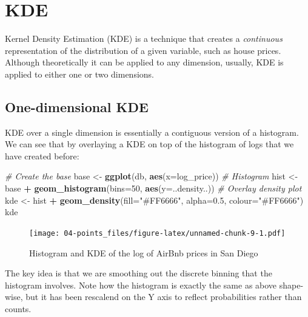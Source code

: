 \documentclass[
]{book}
\newenvironment{Shaded}{\begin{snugshade}}{\end{snugshade}}
\newcommand{\CommentTok}[1]{\textcolor[rgb]{0.56,0.35,0.01}{\textit{#1}}}
\newcommand{\DataTypeTok}[1]{\textcolor[rgb]{0.13,0.29,0.53}{#1}}
\newcommand{\DecValTok}[1]{\textcolor[rgb]{0.00,0.00,0.81}{#1}}
\newcommand{\FloatTok}[1]{\textcolor[rgb]{0.00,0.00,0.81}{#1}}
\newcommand{\KeywordTok}[1]{\textcolor[rgb]{0.13,0.29,0.53}{\textbf{#1}}}
\newcommand{\NormalTok}[1]{#1}
\newcommand{\OperatorTok}[1]{\textcolor[rgb]{0.81,0.36,0.00}{\textbf{#1}}}
\newcommand{\StringTok}[1]{\textcolor[rgb]{0.31,0.60,0.02}{#1}}
\begin{document}
\hypertarget{kde}{%
\section{KDE}\label{kde}}

Kernel Density Estimation (KDE) is a technique that creates a \emph{continuous} representation of the distribution of a given variable, such as house prices. Although theoretically it can be applied to any dimension, usually, KDE is applied to either one or two dimensions.

\hypertarget{one-dimensional-kde}{%
\subsection{One-dimensional KDE}\label{one-dimensional-kde}}

KDE over a single dimension is essentially a contiguous version of a histogram. We can see that by overlaying a KDE on top of the histogram of logs that we have created before:

\begin{Shaded}
\begin{Highlighting}[]
\CommentTok{# Create the base}
\NormalTok{base <-}\StringTok{ }\KeywordTok{ggplot}\NormalTok{(db, }\KeywordTok{aes}\NormalTok{(}\DataTypeTok{x=}\NormalTok{log_price))}
\CommentTok{# Histogram}
\NormalTok{hist <-}\StringTok{ }\NormalTok{base }\OperatorTok{+}\StringTok{ }
\StringTok{  }\KeywordTok{geom_histogram}\NormalTok{(}\DataTypeTok{bins=}\DecValTok{50}\NormalTok{, }\KeywordTok{aes}\NormalTok{(}\DataTypeTok{y=}\NormalTok{..density..))}
\CommentTok{# Overlay density plot}
\NormalTok{kde <-}\StringTok{ }\NormalTok{hist }\OperatorTok{+}\StringTok{ }
\StringTok{  }\KeywordTok{geom_density}\NormalTok{(}\DataTypeTok{fill=}\StringTok{"#FF6666"}\NormalTok{, }\DataTypeTok{alpha=}\FloatTok{0.5}\NormalTok{, }\DataTypeTok{colour=}\StringTok{"#FF6666"}\NormalTok{)}
\NormalTok{kde}
\end{Highlighting}
\end{Shaded}

\begin{figure}
\centering
\texttt{[image: 04-points\_files/figure-latex/unnamed-chunk-9-1.pdf]}
\caption{\label{fig:unnamed-chunk-9}Histogram and KDE of the log of AirBnb prices in San Diego}
\end{figure}

The key idea is that we are smoothing out the discrete binning that the histogram involves. Note how the histogram is exactly the same as above shape-wise, but it has been rescalend on the Y axis to reflect probabilities rather than counts.
\end{document}
